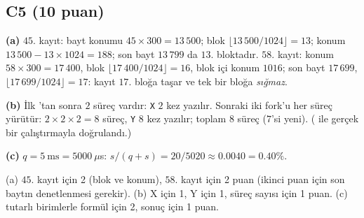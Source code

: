 \subsection*{C5 (10 puan)}
\textbf{(a)} $45$. kayıt: bayt konumu $45 \times 300 = 13\,500$; blok $\lfloor 13\,500/1024 \rfloor = 13$; konum $13\,500 - 13 \times 1024 = 188$; son bayt $13\,799$ da $13$. bloktadır. $58$. kayıt: konum $58 \times 300 = 17\,400$, blok $\lfloor 17\,400/1024\rfloor = 16$, blok içi konum $1016$; son bayt $17\,699$, $\lfloor 17\,699/1024 \rfloor = 17$: kayıt $17$. bloğa taşar ve tek bir bloğa \emph{sığmaz}.

\textbf{(b)} İlk 'tan sonra $2$ süreç vardır: \texttt{X} $2$ kez yazılır. Sonraki iki fork'u her süreç yürütür: $2 \times 2 \times 2 = 8$ süreç, \texttt{Y} $8$ kez yazılır; toplam $8$ süreç ($7$'si yeni). ( ile gerçek bir çalıştırmayla doğrulandı.)

\textbf{(c)} $q = 5\ \text{ms} = 5000\ \mu$s: $s/(q+s) = 20/5020 \approx 0.0040 = 0.40\%$.
\begin{rubric}(a) $45$. kayıt için 2 (blok ve konum), $58$. kayıt için 2 puan (ikinci puan için son baytın denetlenmesi gerekir). (b) X için 1, Y için 1, süreç sayısı için 1 puan. (c) tutarlı birimlerle formül için 2, sonuç için 1 puan.\end{rubric}
